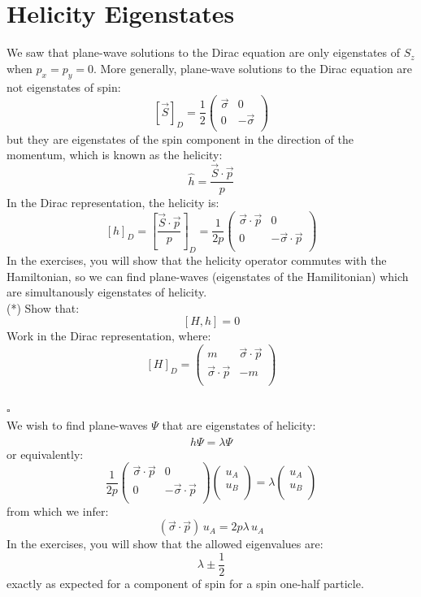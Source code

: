 \documentclass[12pt]{article}
\begin{document}
\section{Helicity Eigenstates}

We saw that plane-wave solutions to the Dirac equation are only eigenstates of $S_z$ when $p_x = p_y = 0$.  More generally, plane-wave solutions to the Dirac equation are not eigenstates of spin:
$$[\vec{S}]_D = \frac{1}{2}
\begin{pmatrix}
\vec{\sigma} & 0 \\
0 & -\vec{\sigma}\\
\end{pmatrix}
$$
but they are eigenstates of the spin component in the direction of the
momentum, which is known as the helicity:
$$\hat{h} = \frac{\vec{S}\cdot\vec{p}}{p}$$
In the Dirac representation, the helicity is:
$$[h]_D = [\frac{\vec{S}\cdot\vec{p}}{p}]_D = \frac{1}{2 p}
\begin{pmatrix}
\vec{\sigma}\cdot\vec{p} & 0 \\
0 & -\vec{\sigma}\cdot\vec{p}\\
\end{pmatrix}
$$
In the exercises, you will show that the helicity operator commutes
with the Hamiltonian, so we can find plane-waves (eigenstates of the
Hamilitonian) which are simultanously eigenstates of helicity.\\[5pt]

\exercise (*) Show that:
$$[H, h] = 0$$
Work in the Dirac representation, where:
$$[H]_D = \begin{pmatrix}
m & \vec{\sigma}\cdot\vec{p} \\
\vec{\sigma}\cdot\vec{p} & -m\\
\end{pmatrix}$$\\
$\square$\\[5pt]
We wish to find plane-waves $\Psi$ that are eigenstates of helicity:
$$\hat{h} \Psi = \lambda \Psi$$
or equivalently:
\begin{equation}
\label{eqn:helicity-eigenstates}
\frac{1}{2p}
\begin{pmatrix}
\vec{\sigma}\cdot\vec{p} & 0 \\
0 & -\vec{\sigma}\cdot\vec{p}\\
\end{pmatrix}
\begin{pmatrix}
u_A \\ u_B \\
\end{pmatrix}
= \lambda
\begin{pmatrix}
u_A \\ u_B \\
\end{pmatrix}
\end{equation}
from which we infer:
\begin{equation}
\label{eqn:helicity-ua}
(\vec{\sigma} \cdot \vec{p}) \, u_A = 2 p \lambda \, u_A
\end{equation}
In the exercises, you will show that the allowed eigenvalues are:
$$\lambda \pm \frac{1}{2}$$
exactly as expected for a component of spin for a spin one-half particle.\\[5pt]
\end{document}
